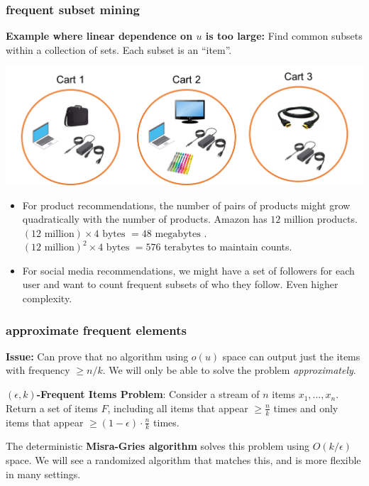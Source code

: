\documentclass[]{beamer}
\begin{document}
	
	\begin{frame}
		\frametitle{frequent subset mining}
		\small
		\textbf{Example where linear dependence on $u$ is too large:} Find common subsets within a collection of sets. Each subset is an ``item''.
		\begin{center}
			\includegraphics[width=.75\textwidth]{itemset1.png}
		\end{center}
		\begin{itemize}
			\item For product recommendations, the number of pairs of products might grow quadratically with the number of products. Amazon has $12$ million products. $(12 \text{ million})\times 4 \text{ bytes }= 48 \text{ megabytes }$.  $(12 \text{ million})^2\times 4 \text{ bytes }= 576 \text{ terabytes}$ to maintain counts.
			\item For social media recommendations, we might have a set of followers for each user and want to count frequent subsets of who they follow. Even higher complexity. 
		\end{itemize}
	\end{frame}
	
	\begin{frame}
		\frametitle{approximate frequent elements}
		\textbf{Issue:} Can prove that no algorithm using $o(u)$ space can output just the items with frequency $\ge n/k$. We will only be able to solve the problem \emph{approximately}.
		
		\vspace{1em}
		\textbf{$(\epsilon,k)$-Frequent Items Problem}: Consider a stream of $n$ items $x_1,\ldots, x_n$. Return a set  of items $F$, including \alert{all items that appear $ \geq \frac{n}{k}$ times} and \alert{only items that appear $\geq (1-\epsilon) \cdot \frac{n}{k}$ times}.

	The deterministic \textbf{Misra-Gries algorithm} solves this problem using $O(k/\epsilon)$ space. We will see a randomized algorithm that matches this, and is more flexible in many settings.
	
	\end{frame}
	
\end{document}
